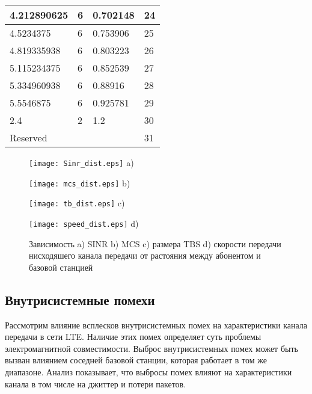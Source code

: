 \begin{table} [htb]
\begin{tabular}{|l|l|l|l|}
    4.212890625    & 6  & 0.702148 & 24      \\ \hline
    4.5234375      & 6  & 0.753906 & 25      \\ \hline
    4.819335938    & 6  & 0.803223 & 26      \\ \hline
    5.115234375    & 6  & 0.852539 & 27      \\ \hline
    5.334960938    & 6  & 0.88916  & 28      \\ \hline
    5.5546875      & 6  & 0.925781 & 29      \\ \hline
    2.4            & 2  & 1.2      & 30      \\ \hline
\multicolumn{3}{|l|}{Reserved}  & 31 \\  \hline
    \end{tabular}
\end{table}

\clearpage

\begin{figure} [!h]
\begin{minipage}[h]{0.47\linewidth}
\center
\texttt{[image: Sinr\_dist.eps]} a) \\
\end{minipage}
\hfill
\begin{minipage}[h]{0.47\linewidth}
\center
\texttt{[image: mcs\_dist.eps]} b) \\
\end{minipage}
\vfill
\begin{minipage}[h]{0.47\linewidth}
\center
\texttt{[image: tb\_dist.eps]} c) \\
\end{minipage}
\hfill
\begin{minipage}[h]{0.47\linewidth}
\center
\texttt{[image: speed\_dist.eps]} d) \\
\end{minipage}
\caption{Зависимость a) SINR b) MCS c) размера TBS d) скорости передачи нисходяшего канала передачи от растояния между абонентом и базовой станцией}
\label{img:dist}
\end{figure}

\subsection{Внутрисистемные помехи}  \label{sect2_2_3}
Рассмотрим влияние всплесков внутрисистемных помех на характеристики канала передачи в сети LTE. Наличие этих помех определяет суть проблемы электромагнитной совместимости. Выброс внутрисистемных помех может быть вызван влиянием соседней базовой станции, которая работает в том же диапазоне.
Анализ показывает, что выбросы помех влияют на характеристики канала в том числе на джиттер и  потери пакетов.

